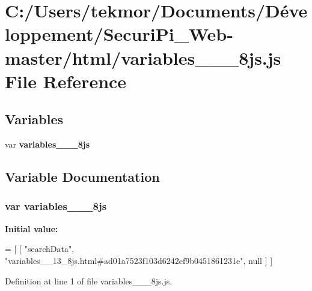 \section{C\+:/\+Users/tekmor/\+Documents/\+Développement/\+Securi\+Pi\+\_\+\+Web-\/master/html/variables\+\_\+\+\_\+\_\+8js.js File Reference}
\label{variables____13__8js_8js}
\subsection*{Variables}
\begin{DoxyCompactItemize}
\item 
var {\bf variables\+\_\+\+\_\+\_\+8js}
\end{DoxyCompactItemize}


\subsection{Variable Documentation}
\subsubsection[{variables\+\_\+\+\_\+13\+\_\+8js}]{\setlength{\rightskip}{0pt plus 5cm}var variables\+\_\+\+\_\+\_\+8js}\label{variables____13__8js_8js_a6a6117f87db6985fc760ff3e40f7c2d8}
{\bfseries Initial value\+:}
\begin{DoxyCode}
=
[
    [ \textcolor{stringliteral}{"searchData"}, \textcolor{stringliteral}{"variables\_\_13\_8js.html#ad01a7523f103d6242ef9b0451861231e"}, null ]
]
\end{DoxyCode}


Definition at line 1 of file variables\+\_\+\+\_\+\_\+8js.\+js.

